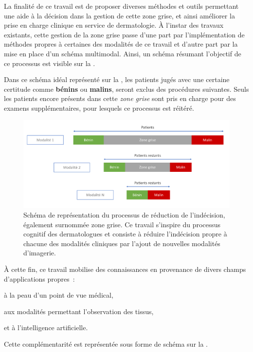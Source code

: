 La finalité de ce travail est de proposer diverses méthodes et outils permettant une aide à la décision dans la gestion de cette zone grise, et ainsi améliorer la prise en charge clinique en service de dermatologie. À l'instar des travaux existants, cette gestion de la zone grise passe d'une part par l'implémentation de méthodes propres à certaines des modalités de ce travail et d'autre part par la mise en place d'un schéma multimodal. Ainsi, un schéma résumant l'objectif de ce processus est visible sur la .\par
\clearpage

Dans ce schéma idéal représenté sur la , les patients jugés avec une certaine certitude comme \textbf{bénins} ou \textbf{malins}, seront exclus des procédures suivantes. Seuls les patients encore présents dans cette \textit{zone grise} sont pris en charge pour des examens supplémentaires, pour lesquels ce processus est réitéré.\par 

\begin{figure}[H]
    \centering
    \includegraphics[width=\linewidth]{contents/i_introduction/resources/scheme_reduce_indecision.pdf}
    \caption{Schéma de représentation du processus de réduction de l'indécision, également surnommée zone grise. Ce travail s'inspire du processus cognitif des dermatologues et consiste à réduire l'indécision propre à chacune des modalités cliniques par l'ajout de nouvelles modalités d'imagerie.}
    \label{fig:scheme_reduce_indecision}
\end{figure}\par

À cette fin, ce travail mobilise des connaissances en provenance de divers champs d'applications propres~:
\begin{inlinerate}
    \item à la peau d'un point de vue médical, 
    \item aux modalités permettant l'observation des tissus,
    \item et à l'intelligence artificielle.
\end{inlinerate} Cette complémentarité est représentée sous forme de schéma sur la .\par

